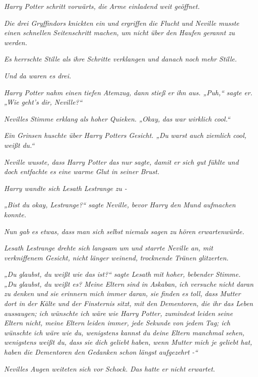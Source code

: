{\emph{Harry Potter schritt vorwärts,} \emph{die} \emph{Arme einladend weit geöffnet.}

\emph{Die drei Gryffindors knickten ein und} \emph{ergriffen die Flucht} \emph{und Neville musste einen schnellen Seitenschritt machen, um nicht über den Haufen gerannt zu werden.}

\emph{Es herrschte Stille als ihre Schritte verklangen und danach noch mehr Stille.}

\emph{Und da waren es drei.}

\emph{Harry Potter nahm einen tiefen Atemzug, dann stieß er ihn aus. „Puh,“ sagte er. „Wie geht's dir, Neville?“}

\emph{Nevilles Stimme erklang als hoher Quieken. „Okay,} \emph{\emph{das}} \emph{war wirklich cool.“}

\emph{Ein Grinsen huschte über Harry Potters Gesicht. „\emph{Du}} \emph{warst auch ziemlich cool, weißt du.“}

\emph{Neville wusste, dass Harry Potter das nur sagte, damit er sich gut fühlte und doch entfachte es eine warme Glut in seiner Brust.}

\emph{Harry wandte sich Lesath Lestrange zu -}

\emph{„Bist du okay, Lestrange?“ sagte Neville, bevor Harry den Mund aufmachen konnte.}

\emph{Nun gab es etwas, dass man sich selbst niemals sagen} \emph{zu hören} \emph{erwartenwürde.}

\emph{Lesath Lestrange drehte sich langsam um und starrte Neville an, mit verkniffenem Gesicht, nicht länger weinend,} \emph{trocknende} \emph{Tränen glitzerten.}

\emph{„Du glaubst, du weißt wie das ist?“ sagte Lesath mit hoher, bebender Stimme. „\emph{Du glaubst, du weißt es?}} \emph{Meine Eltern sind in} \emph{\emph{Askaban,}} \emph{ich versuche nicht daran zu denken und sie erinnern mich immer daran, sie finden es} \emph{\emph{toll,}} \emph{dass Mutter dort in der Kälte und der Finsternis sitzt, mit den Dementoren, die ihr das Leben aussaugen; ich wünschte ich wäre wie Harry Potter, zumindest leiden seine Eltern nicht, meine Eltern leiden immer, jede Sekunde} \emph{von jedem} \emph{Tag; ich wünschte ich wäre wie du, wenigstens kannst du deine Eltern manchmal sehen, wenigstens weißt du, dass sie dich geliebt haben, wenn Mutter mich je geliebt hat, haben die Dementoren den Gedanken schon längst aufgezehrt -“}

\emph{Nevilles Augen weiteten sich vor Schock. Das hatte er nicht erwartet.}

}
